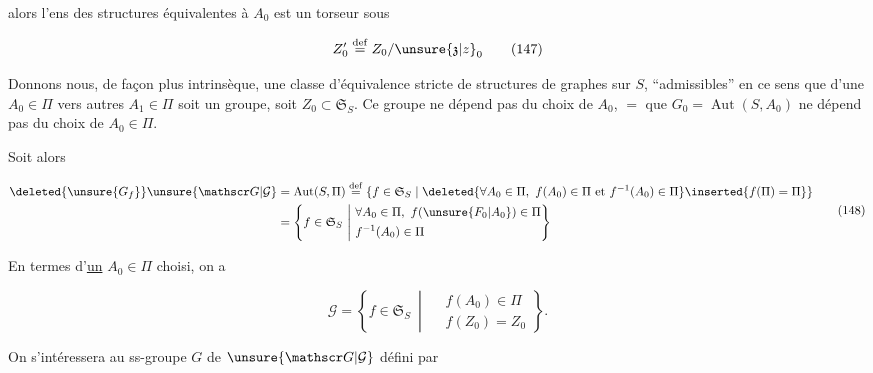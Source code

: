 alors l'ens des structures  équivalentes à $A_0$ est un torseur sous 

\[
 Z'_0\overset{\mathrm{def}}{=}Z_0/\unsure{\mathfrak z|z}_0
 \tag*{(147)}
\]

Donnons nous, de façon plus intrinsèque, une classe d'équivalence stricte \inserted{$\Pi$} de structures de graphes sur $S$, ``admissibles'' en ce sens que   d'une  $A_0\in\Pi$ vers  autres  $A_1\in\Pi$ soit un groupe, soit $Z_0\subset\mathfrak S_S$. Ce groupe ne dépend pas du choix de $A_0$,  $=$ que $G_0=\operatorname{Aut}(S,A_0)$ ne dépend pas du choix de $A_0\in\Pi$.



Soit alors

\[
 \begin{aligned}
 \deleted{\unsure{G_f}}\unsure{\mathscr G|\mathcal G}&=\operatorname{Aut}(S,\Pi)
 \overset{\mathrm{def}}{=}
 \{f\in\mathfrak S_S\mid
 \deleted{\forall A_0\in\Pi,\ f(A_0)\in\Pi\text{ et }f^{-1}(A_0)\in\Pi}
 \inserted{f(\Pi)=\Pi}\}\\
 &=\left\{f\in\mathfrak S_S\ \middle|\ 
 \begin{aligned}
 &\forall A_0\in\Pi,\ f(\unsure{F_0|A_0})\in\Pi\\
 & f^{-1}(A_0)\in\Pi
 \end{aligned}\right\}
 \end{aligned}
 \tag*{(148)}
\]

En termes d'\uline{un} $A_0\in\Pi$ choisi, on a

\[
 \mathscr G=\left\{f\in\mathfrak S_S\ \middle|\
 \begin{aligned} &f(A_0)\in\Pi\\ &f(Z_0)=Z_0\end{aligned}\right\}.
 \tag*{(149)}
\]


On  s'intéressera au ss-groupe $G$ de $\unsure{\mathscr G|\mathcal G}$ défini par

